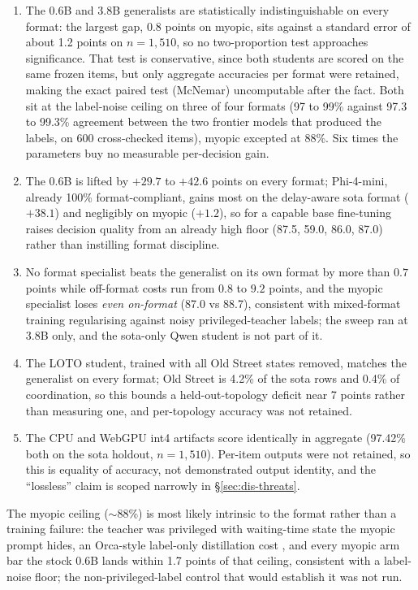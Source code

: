 \begin{enumerate}
\item {} The 0.6B and 3.8B generalists are
statistically indistinguishable on every format: the largest gap, 0.8
points on myopic, sits against a standard error of about 1.2 points on
$n{=}1{,}510$, so no two-proportion test approaches significance. That
test is conservative, since both students are scored on the same frozen
items, but only aggregate accuracies per format were retained, making the
exact paired test (McNemar) uncomputable after the fact. Both sit at the
label-noise ceiling on three of four formats (97 to 99\% against 97.3 to
99.3\% agreement between the two frontier models that produced the labels,
on 600 cross-checked items), myopic excepted at 88\%. Six times the
parameters buy no measurable per-decision gain.
\item {} The 0.6B is
lifted by $+29.7$ to $+42.6$ points on every format; Phi-4-mini, already
100\% format-compliant, gains most on the delay-aware sota format
($+38.1$) and negligibly on myopic ($+1.2$), so for a capable base
fine-tuning raises decision quality from an already high floor (87.5,
59.0, 86.0, 87.0) rather than instilling format discipline.
\item {} No format specialist beats the generalist
on its own format by more than $0.7$ points while off-format costs run from
$0.8$ to $9.2$ points, and the myopic specialist loses \emph{even
on-format} (87.0 vs 88.7), consistent with mixed-format training
regularising against noisy privileged-teacher labels; the sweep ran at
3.8B only, and the sota-only Qwen student is not part of it.
\item {} The LOTO student,
trained with all Old Street states removed, matches the generalist on every
format; Old Street is 4.2\% of the sota rows and 0.4\% of coordination, so
this bounds a held-out-topology deficit near 7 points rather than measuring
one, and per-topology accuracy was not retained.
\item {} The
CPU and WebGPU int4 artifacts score identically in aggregate (97.42\% both
on the sota holdout, $n{=}1{,}510$). Per-item outputs were not retained, so
this is equality of accuracy, not demonstrated output identity, and the
``lossless'' claim is scoped narrowly in \S\ref{sec:dis-threats}.
\end{enumerate}
The myopic ceiling ($\sim$88\%) is most likely intrinsic to the format
rather than a training failure: the teacher was privileged with
waiting-time state the myopic prompt hides, an Orca-style label-only
distillation cost \cite{mukherjee2023orca}, and every myopic arm bar the
stock 0.6B lands within 1.7 points of that ceiling, consistent with a
label-noise floor; the non-privileged-label control that would establish
it was not run.
